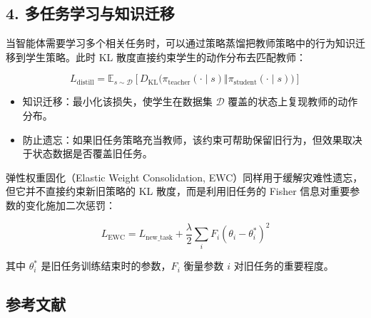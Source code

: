 \hypertarget{ux591aux4efbux52a1ux5b66ux4e60ux4e0eux77e5ux8bc6ux8fc1ux79fb}{%
\subsection{4. 多任务学习与知识迁移}\label{ux591aux4efbux52a1ux5b66ux4e60ux4e0eux77e5ux8bc6ux8fc1ux79fb}}

当智能体需要学习多个相关任务时，可以通过策略蒸馏把教师策略中的行为知识迁移到学生策略。此时 KL 散度直接约束学生的动作分布去匹配教师：

\[
L_{\mathrm{distill}}
=
\mathbb{E}_{s\sim\mathcal{D}}
\left[
D_{\mathrm{KL}}\bigl(
\pi_{\mathrm{teacher}}(\cdot\mid s)
\Vert
\pi_{\mathrm{student}}(\cdot\mid s)
\bigr)
\right]
\]

\begin{itemize}
\tightlist
\item
  知识迁移：最小化该损失，使学生在数据集 \(\mathcal{D}\) 覆盖的状态上复现教师的动作分布。
\item
  防止遗忘：如果旧任务策略充当教师，该约束可帮助保留旧行为，但效果取决于状态数据是否覆盖旧任务。
\end{itemize}

弹性权重固化（Elastic Weight Consolidation, EWC）同样用于缓解灾难性遗忘，但它并不直接约束新旧策略的 KL 散度，而是利用旧任务的 Fisher 信息对重要参数的变化施加二次惩罚：

\[
L_{\mathrm{EWC}}
=
L_{\mathrm{new\_task}}
+
\frac{\lambda}{2}
\sum_i F_i(\theta_i-\theta_i^{*})^{2}
\]

其中 \(\theta_i^{*}\) 是旧任务训练结束时的参数，\(F_i\) 衡量参数 \(i\) 对旧任务的重要程度。

\FloatBarrier
{}
\hypertarget{ux53c2ux8003ux6587ux732e-59}{%
\subsection{参考文献}\label{ux53c2ux8003ux6587ux732e-59}}

